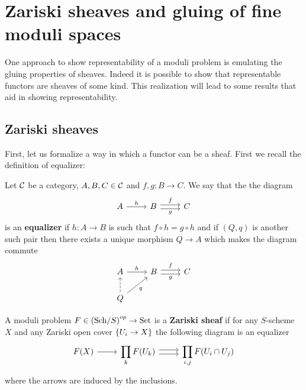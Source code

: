 \section{Zariski sheaves and gluing of fine moduli spaces}
One approach to show representability of a moduli problem is emulating the gluing properties of sheaves.
Indeed it is possible to show that representable functors are sheaves of some kind. This realization will lead to some results that aid in showing representability. 

\subsection{Zariski sheaves}
First, let us formalize a way in which a functor can be a sheaf. First we recall the definition of equalizer:

\begin{definition}[Equalizer]
Let $\mathcal{C}$ be a category, $A,B,C\in \mathcal{C}$ and $f,g:B\to C$. We say that the the diagram 
\[\begin{tikzcd}
	A & B & C
	\arrow["h", from=1-1, to=1-2]
	\arrow["f", shift left, from=1-2, to=1-3]
	\arrow["g"', shift right, from=1-2, to=1-3]
\end{tikzcd}\]
is an \textbf{equalizer} if $h:A\to B$ is such that $f\circ h=g\circ h$ and if $(Q,q)$ is another such pair then there exists a unique morphism $Q\to A$ which makes the diagram commute
\[\begin{tikzcd}
	A & B & C \\
	Q
	\arrow["h", from=1-1, to=1-2]
	\arrow["f", shift left, from=1-2, to=1-3]
	\arrow["g"', shift right, from=1-2, to=1-3]
	\arrow["q"', from=2-1, to=1-2]
	\arrow[dashed, from=2-1, to=1-1]
\end{tikzcd}\]
\end{definition}

\begin{definition}
A moduli problem $F\in \left({\mathrm{Sch}}/{S}\right)^{op}\to \mathrm{Set}$ is a \textbf{Zariski sheaf} if for any $S$-scheme $X$ and any Zariski open cover $\left\{{U_i\to X}\right\}$ the following diagram is an equalizer
\[\begin{tikzcd}
	{F(X)} & {\displaystyle \prod_k F(U_k)} & {\displaystyle \prod_{i,j}F(U_i\cap U_j)}
	\arrow[from=1-1, to=1-2]
	\arrow[shift left, from=1-2, to=1-3]
	\arrow[shift right, from=1-2, to=1-3]
\end{tikzcd}\]
where the arrows are induced by the inclusions.
\end{definition}

